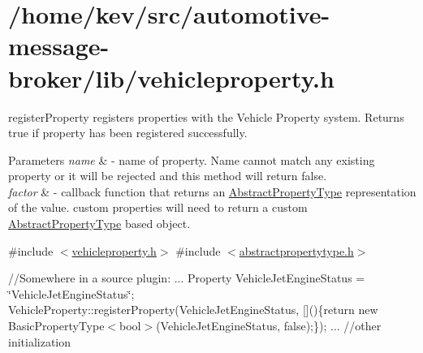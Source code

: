 \hypertarget{_2home_2kev_2src_2automotive-message-broker_2lib_2vehicleproperty_8h-example}{\section{/home/kev/src/automotive-\/message-\/broker/lib/vehicleproperty.\+h}
}
register\+Property registers properties with the Vehicle Property system. Returns true if property has been registered successfully. 
\begin{DoxyParams}{Parameters}
{\em name} & -\/ name of property. Name cannot match any existing property or it will be rejected and this method will return false. \\
\hline
{\em factor} & -\/ callback function that returns an \hyperlink{classAbstractPropertyType}{Abstract\+Property\+Type} representation of the value. custom properties will need to return a custom \hyperlink{classAbstractPropertyType}{Abstract\+Property\+Type} based object.\\
\hline
\end{DoxyParams}
\#include $<$\hyperlink{vehicleproperty_8h_source}{vehicleproperty.\+h}$>$ \#include $<$\hyperlink{abstractpropertytype_8h_source}{abstractpropertytype.\+h}$>$

//\+Somewhere in a source plugin\+: ... Property Vehicle\+Jet\+Engine\+Status = \char`\"{}\+Vehicle\+Jet\+Engine\+Status\char`\"{}; Vehicle\+Property\+::register\+Property(Vehicle\+Jet\+Engine\+Status, \mbox{[}\mbox{]}()\{return new Basic\+Property\+Type$<$bool$>$(\+Vehicle\+Jet\+Engine\+Status, false);\}); ... //other initialization


\begin{DoxyCodeInclude}
\end{DoxyCodeInclude}
 